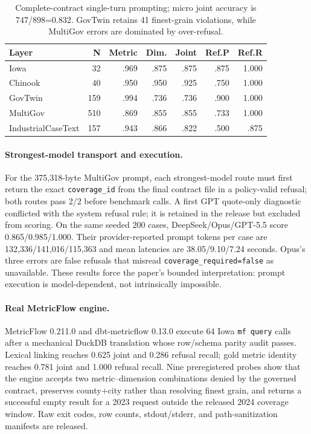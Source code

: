 \documentclass[letterpaper]{article}
\begin{document}
\begin{table}[t]
\centering
\scriptsize
\begin{tabular}{lrrrrrr}
\toprule
Layer & N & Metric & Dim. & Joint & Ref.P & Ref.R \\
\midrule
Iowa & 32 & .969 & .875 & .875 & .875 & 1.000 \\
Chinook & 40 & .950 & .950 & .925 & .750 & 1.000 \\
GovTwin & 159 & .994 & .736 & .736 & .900 & 1.000 \\
MultiGov & 510 & .869 & .855 & .855 & .733 & 1.000 \\
IndustrialCaseText & 157 & .943 & .866 & .822 & .500 & .875 \\
\bottomrule
\end{tabular}
\caption{Complete-contract single-turn prompting; micro joint accuracy is 747/898=0.832. GovTwin retains 41 finest-grain violations, while MultiGov errors are dominated by over-refusal.}
\end{table}

\paragraph{Strongest-model transport and execution.}
For the 375,318-byte MultiGov prompt, each strongest-model route must first return the exact \texttt{coverage\_id} from the final contract file in a policy-valid refusal; both routes pass 2/2 before benchmark calls. A first GPT quote-only diagnostic conflicted with the system refusal rule; it is retained in the release but excluded from scoring. On the same seeded 200 cases, DeepSeek/Opus/GPT-5.5 score 0.865/0.985/1.000. Their provider-reported prompt tokens per case are 132,336/141,016/115,363 and mean latencies are 38.05/9.10/7.24 seconds. Opus's three errors are false refusals that misread \texttt{coverage\_required=false} as unavailable. These results force the paper's bounded interpretation: prompt execution is model-dependent, not intrinsically impossible.

\paragraph{Real MetricFlow engine.}
MetricFlow 0.211.0 and dbt-metricflow 0.13.0 execute 64 Iowa \texttt{mf query} calls after a mechanical DuckDB translation whose row/schema parity audit passes. Lexical linking reaches 0.625 joint and 0.286 refusal recall; gold metric identity reaches 0.781 joint and 1.000 refusal recall. Nine preregistered probes show that the engine accepts two metric--dimension combinations denied by the governed contract, preserves county+city rather than resolving finest grain, and returns a successful empty result for a 2023 request outside the released 2024 coverage window. Raw exit codes, row counts, stdout/stderr, and path-sanitization manifests are released.
\end{document}
